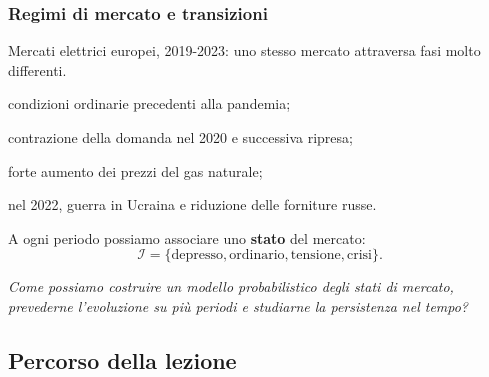 \begin{frame}%
%

\frametitle{Regimi di mercato e transizioni}%
%

%


Mercati elettrici europei, 2019-2023: uno stesso mercato attraversa fasi molto differenti.

\medskip

\begin{stepitemize}
\item condizioni ordinarie precedenti alla pandemia;

\item contrazione della domanda nel 2020 e successiva ripresa;

\item forte aumento dei prezzi del gas naturale;

\item nel 2022, guerra in Ucraina e riduzione delle forniture russe.
\end{stepitemize}

\medskip

A ogni periodo possiamo associare uno \textbf{stato} del mercato:
\[
\mathcal{I} = \{ \text{depresso}, \text{ordinario}, \text{tensione},
\text{crisi} \}.
\]


\medskip

\begin{center}
{\small \emph{Come possiamo costruire un modello probabilistico degli stati di
mercato, prevederne l'evoluzione su pi\`{u} periodi e studiarne la persistenza
nel tempo?}}
\end{center}

%

\transboxout
\end{frame}%






\subsection{Percorso della lezione}%

